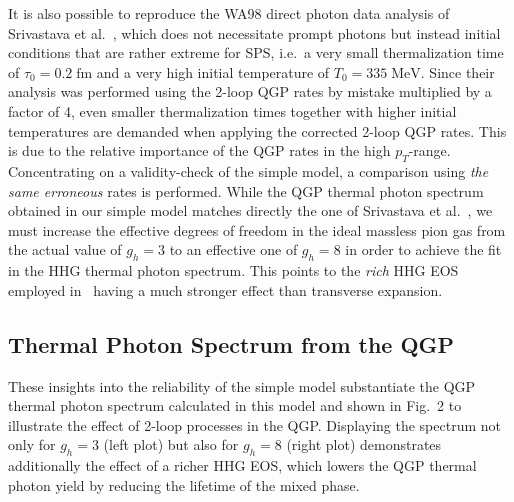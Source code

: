 \documentclass[12pt,twoside,fleqn]{article}
\newcommand{\fm}{\mbox{fm}}
\newcommand{\MeV}{\mbox{MeV}}
\begin{document}
It is also possible to reproduce the WA98 direct photon data analysis of
Srivastava et al.~\cite{SRIVASTAVA_2000}, which does not necessitate prompt
photons but instead initial conditions that are rather extreme for SPS, i.e.\ a
very small thermalization time of $\tau_0 = 0.2\;\fm$ and a very high initial
temperature of $T_0 = 335\;\MeV$. Since their analysis was performed using the
2-loop QGP rates by mistake multiplied by a factor of 4, even smaller
thermalization times together with higher initial temperatures are demanded when
applying the corrected 2-loop QGP rates. This is due to the relative importance
of the QGP rates in the high $p_T$-range.  Concentrating on a validity-check of
the simple model, a comparison using {\em the same erroneous} rates is
performed. While the QGP thermal photon spectrum obtained in our simple model
matches directly the one of Srivastava et al.~\cite{SRIVASTAVA_2000}, we must
increase the effective degrees of freedom in the ideal massless pion gas from
the actual value of $g_h = 3$ to an effective one of $g_h =8$ in order to
achieve the fit in the HHG thermal photon spectrum. This points to the {\em
  rich} HHG EOS employed in~\cite{SRIVASTAVA_2000} having a much stronger effect
than transverse expansion.
%
\subsection{Thermal Photon Spectrum from the QGP}
%
These insights into the reliability of the simple model substantiate the QGP
thermal photon spectrum calculated in this model and shown in Fig.~2 to
illustrate the effect of 2-loop processes in the QGP. Displaying the spectrum
not only for $g_h = 3$ (left plot) but also for $g_h =8$ (right plot)
demonstrates additionally the effect of a richer HHG EOS, which lowers the QGP
thermal photon yield by reducing the lifetime of the mixed phase.
%
\end{document}

